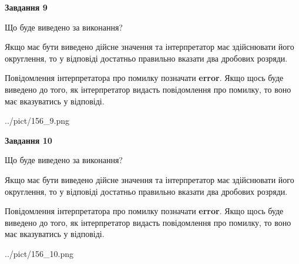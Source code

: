 \documentclass[12pt, ukrainian]{article}
\begin{document}
{\begin {Large}
{\begin {center}\textbf{Завдання 9}\end {center}}\par
Що буде виведено за виконання? \par

Якщо має бути виведено дійсне значення та інтерпретатор має здійснювати його округлення, 
то у відповіді достатньо правильно вказати два дробових розряди.

Повідомлення інтерпретатора про помилку позначати \textbf{error}.
Якщо щось буде виведено до того, як інтерпретатор видасть повідомлення про помилку, 
то воно має вказуватись у відповіді. \par

\begin{center}
	{../pict/156_9.png}
\end{center}
\newpage

{\begin {center}\textbf{Завдання 10}\end {center}}\par
Що буде виведено за виконання? \par

Якщо має бути виведено дійсне значення та інтерпретатор має здійснювати його округлення, 
то у відповіді достатньо правильно вказати два дробових розряди.

Повідомлення інтерпретатора про помилку позначати \textbf{error}.
Якщо щось буде виведено до того, як інтерпретатор видасть повідомлення про помилку, 
то воно має вказуватись у відповіді. \par

\begin{center}
	{../pict/156_10.png}
\end{center}
\newpage

\end {Large}}
\end{document}
